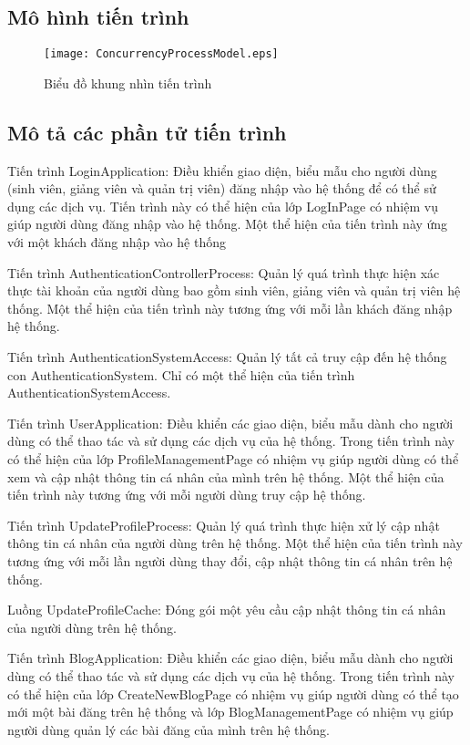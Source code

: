 \documentclass[./../main_file.tex]{subfiles}
\begin{document}
\subsection{Mô hình tiến trình}
\begin{figure}[H]
	\centering
\texttt{[image: ConcurrencyProcessModel.eps]}
	\caption{Biểu đồ khung nhìn tiến trình}
\end{figure}
\subsection{Mô tả các phần tử tiến trình}
\begin{description}
\item Tiến trình LoginApplication: Điều khiển giao diện, biểu mẫu cho người dùng (sinh viên, giảng viên và quản trị viên) đăng nhập vào hệ thống để có thể sử dụng các dịch vụ. Tiến trình này có thể hiện của lớp LogInPage có nhiệm vụ giúp người dùng đăng nhập vào hệ thống.
Một thể hiện của tiến trình này ứng với một khách đăng nhập vào hệ thống
\item Tiến trình AuthenticationControllerProcess: Quản lý quá trình thực hiện xác thực tài khoản của người dùng bao gồm sinh viên, giảng viên và quản trị viên hệ thống.
Một thể hiện của tiến trình này tương ứng với mỗi lần khách đăng nhập hệ thống.
\item Tiến trình AuthenticationSystemAccess: Quản lý tất cả truy cập đến hệ thống con AuthenticationSystem.
Chỉ có một thể hiện của tiến trình AuthenticationSystemAccess.
\item Tiến trình UserApplication: Điều khiển các giao diện, biểu mẫu dành cho người dùng có thể thao tác và sử dụng các dịch vụ của hệ thống. Trong tiến trình này có  thể hiện của lớp ProfileManagementPage có nhiệm vụ giúp người dùng có thể xem và cập nhật thông tin cá nhân của mình trên hệ thống.
Một thể hiện của tiến trình này tương ứng với mỗi người dùng truy cập hệ thống.
\item Tiến trình UpdateProfileProcess: Quản lý quá trình thực hiện xử lý cập nhật thông tin cá nhân của người dùng trên hệ thống.
Một thể hiện của tiến trình này tương ứng với mỗi lần người dùng thay đổi, cập nhật thông tin cá nhân trên hệ thống.
\item Luồng UpdateProfileCache: Đóng gói một yêu cầu cập nhật thông tin cá nhân của người dùng trên hệ thống.
\item Tiến trình BlogApplication: Điều khiển các giao diện, biểu mẫu dành cho người dùng có thể thao tác và sử dụng các dịch vụ của hệ thống. Trong tiến trình này có thể hiện của lớp CreateNewBlogPage có nhiệm vụ giúp người dùng có thể tạo mới một bài đăng trên hệ thống và lớp BlogManagementPage có nhiệm vụ giúp người dùng quản lý các bài đăng của mình trên hệ thống.

\end{description}
\end{document}
